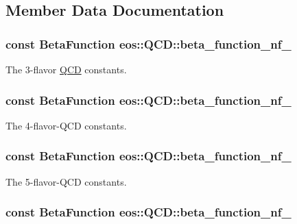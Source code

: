 \subsection{Member Data Documentation}
\hypertarget{classeos_1_1QCD_ae21fca3bee658d5b53bc12af43fa8fc2}{
\subsubsection[{beta\_\-function\_\-nf\_\-3}]{\setlength{\rightskip}{0pt plus 5cm}const {\bf BetaFunction} {\bf eos::QCD::beta\_\-function\_\-nf\_}}}
\label{classeos_1_1QCD_ae21fca3bee658d5b53bc12af43fa8fc2}
The 3-\/flavor \hyperlink{classeos_1_1QCD}{QCD} constants. \hypertarget{classeos_1_1QCD_a142158984dbb9ebc03f970d1dc3189c2}{
\subsubsection[{beta\_\-function\_\-nf\_\-4}]{\setlength{\rightskip}{0pt plus 5cm}const {\bf BetaFunction} {\bf eos::QCD::beta\_\-function\_\-nf\_}}}
\label{classeos_1_1QCD_a142158984dbb9ebc03f970d1dc3189c2}
The 4-\/flavor-\/QCD constants. \hypertarget{classeos_1_1QCD_a5022dbb4487a457142d0d04d18494d88}{
\subsubsection[{beta\_\-function\_\-nf\_\-5}]{\setlength{\rightskip}{0pt plus 5cm}const {\bf BetaFunction} {\bf eos::QCD::beta\_\-function\_\-nf\_}}}
\label{classeos_1_1QCD_a5022dbb4487a457142d0d04d18494d88}
The 5-\/flavor-\/QCD constants. \hypertarget{classeos_1_1QCD_abc5015326a2e2c0544aa5d2a392b7ea1}{
\subsubsection[{beta\_\-function\_\-nf\_\-6}]{\setlength{\rightskip}{0pt plus 5cm}const {\bf BetaFunction} {\bf eos::QCD::beta\_\-function\_\-nf\_}}}
